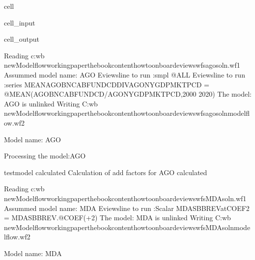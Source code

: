 \documentclass[letterpaper,10pt,english]{jupyterBook}
\begin{document}
\begin{sphinxuseclass}{cell}
\begin{sphinxVerbatimInput}
\begin{sphinxuseclass}{cell_input}
\end{sphinxuseclass}\end{sphinxVerbatimInput}
\begin{sphinxVerbatimOutput}

\begin{sphinxuseclass}{cell_output}
\begin{sphinxVerbatim}[commandchars=\\\{\}]
Reading c:\PYGZbs{}wb new\PYGZbs{}Modelflow\PYGZbs{}working\PYGZus{}paper\PYGZbs{}thebook\PYGZbs{}content\PYGZbs{}howto\PYGZbs{}onboard\PYGZbs{}eviews\PYGZbs{}wfs\PYGZbs{}agosoln.wf1
Assummed model name: AGO
Eviewsline to run :smpl @ALL
Eviewsline to run :series MEAN\PYGZus{}AGOBNCABFUNDCD\PYGZus{}DIV\PYGZus{}AGONYGDPMKTPCD = @MEAN(AGOBNCABFUNDCD/AGONYGDPMKTPCD,\PYGZdq{}2000 2020\PYGZdq{})
The model: AGO is unlinked 
Writing C:\PYGZbs{}wb new\PYGZbs{}Modelflow\PYGZbs{}working\PYGZus{}paper\PYGZbs{}thebook\PYGZbs{}content\PYGZbs{}howto\PYGZbs{}onboard\PYGZbs{}eviews\PYGZbs{}wfs\PYGZbs{}agosoln\PYGZus{}modelflow.wf2
\end{sphinxVerbatim}

\begin{sphinxVerbatim}[commandchars=\\\{\}]
Model name: AGO

Processing the model:AGO
\end{sphinxVerbatim}

\begin{sphinxVerbatim}[commandchars=\\\{\}]
testmodel calculated  
Calculation of add factors for AGO calculated  
\end{sphinxVerbatim}

\begin{sphinxVerbatim}[commandchars=\\\{\}]
Reading c:\PYGZbs{}wb new\PYGZbs{}Modelflow\PYGZbs{}working\PYGZus{}paper\PYGZbs{}thebook\PYGZbs{}content\PYGZbs{}howto\PYGZbs{}onboard\PYGZbs{}eviews\PYGZbs{}wfs\PYGZbs{}MDAsoln.wf1
Assummed model name: MDA
Eviewsline to run :Scalar \PYGZus{}MDASBBREV\PYGZus{}at\PYGZus{}COEF\PYGZus{}2 = \PYGZus{}MDASBBREV.@COEF(+2)
The model: MDA is unlinked 
Writing C:\PYGZbs{}wb new\PYGZbs{}Modelflow\PYGZbs{}working\PYGZus{}paper\PYGZbs{}thebook\PYGZbs{}content\PYGZbs{}howto\PYGZbs{}onboard\PYGZbs{}eviews\PYGZbs{}wfs\PYGZbs{}MDAsoln\PYGZus{}modelflow.wf2
\end{sphinxVerbatim}

\begin{sphinxVerbatim}[commandchars=\\\{\}]
Model name: MDA
\end{sphinxVerbatim}


\end{sphinxuseclass}
\end{sphinxVerbatimOutput}
\end{sphinxuseclass}
\end{document}
